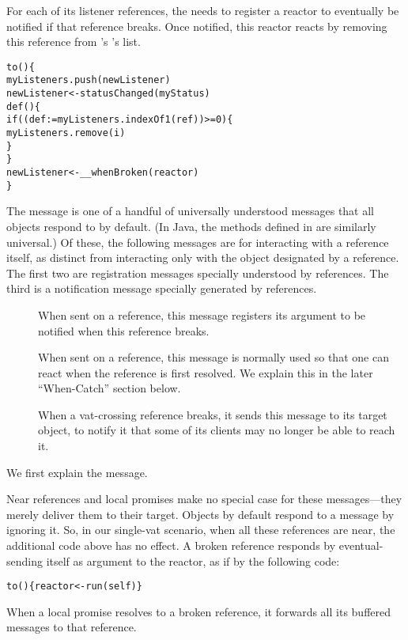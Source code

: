 \documentclass{llncs}
\begin{document}
For each of its listener references, the  needs to
register a reactor to eventually be notified if that reference
breaks. Once notified, this reactor reacts by removing this reference
from 's 's list.
%
\begin{alltt}
    to () \{
        myListeners.push(newListener)
        newListener <- statusChanged(myStatus)
        def () \{
            if ((def  := myListeners.indexOf1(ref)) >= 0) \{
                myListeners.remove(i)
            \}
        \}
        newListener <- \_\_whenBroken(reactor)
    \}
\end{alltt}
%
The  message is one of a handful of universally
understood messages that all objects respond to by default. (In Java,
the methods defined in  are similarly
universal.) Of these, the following messages are for interacting with
a reference itself, as distinct from interacting only with the object
designated by a reference. The first two are registration messages
specially understood by references. The third is a notification
message specially generated by references.
%
\begin{description}
\item[] When sent on a reference,
  this message registers its argument to be notified when this
  reference breaks.
\item[] When sent on a
  reference, this message is normally used so that one can react when
  the reference is first resolved. We explain this in the later
  ``When-Catch'' section below.
\item[] When a
  vat-crossing reference breaks, it sends this message to its target
  object, to notify it that some of its clients may no longer be able
  to reach it.
\end{description}
%
We first explain the  message.

Near references and local promises make no special case for these
messages---they merely deliver them to their target. Objects by
default respond to a  message by ignoring it. So,
in our single-vat scenario, when all these references are near, the
additional code above has no effect. A broken reference responds by
eventual-sending itself as argument to the reactor, as if by the
following code:
%
\begin{alltt}
    to () \{ reactor <- run(self) \}
\end{alltt}
%
When a local promise resolves to a broken reference, it forwards all
its buffered messages to that reference.
\end{document}
